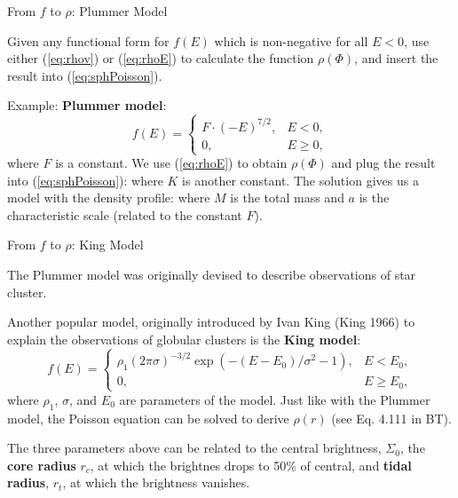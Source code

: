 \documentclass[letterpaper,landscape]{slides}
\begin{document}
\begin{slide}
\begin{center}
{\large \color{red} 
                  From $f$ to $\rho$: Plummer Model  }
\end{center}

Given any functional form for $f(E)$ which is non-negative for all $E < 0$, use either (\ref{eq:rhov}) or (\ref{eq:rhoE})
to calculate the function $\rho(\Phi)$, and insert the result into (\ref{eq:sphPoisson}).

Example: {\bf Plummer model}:
{ \color{blue}
  \[
    f(E)=\left\{
                \begin{array}{ll}
                  F\cdot(-E)^{7/2}, & E < 0, \\
                  0, & E \ge 0, 
                \end{array}
              \right.
  \]
}
where $F$ is a constant. We use (\ref{eq:rhoE}) to obtain $\rho(\Phi)$ and plug the result into (\ref{eq:sphPoisson}):
where $K$ is another constant. The solution gives us a model with the density profile:
where $M$ is the total mass and $a$ is the characteristic scale (related to the constant $F$).

\vfill
\end{slide}


\begin{slide}
\begin{center}
{\large \color{red} 
                  From $f$ to $\rho$: King Model  }
\end{center}

The Plummer model was originally devised to describe observations of star
cluster.

Another popular model, originally introduced by Ivan King (King 1966) to explain
the observations of globular clusters is the {\bf King model}:
{ \color{blue}
  \[
    f(E)=\left\{
                \begin{array}{ll}
                  \rho_1(2\pi\sigma)^{-3/2}\exp(-(E-E_0)/\sigma^2 - 1), & E < E_0, \\
                  0, & E \ge E_0, 
                \end{array}
              \right.
  \]
}
where $\rho_1$, $\sigma$, and $E_0$ are parameters of the model. Just like with the
Plummer model, the Poisson equation can be solved to derive $\rho(r)$ (see
Eq. 4.111 in BT).

The three parameters above can be related to the central brightness,
$\Sigma_0$, the {\bf core radius} $r_c$, at which the brightnes drops to
50\% of central, and {\bf tidal radius}, $r_t$, at which the brightness
vanishes.

\vfill
\end{slide}
\end{document}
